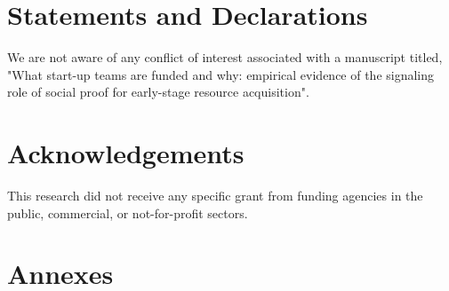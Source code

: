 \documentclass[12pt]{article}
\begin{document}



\clearpage





\clearpage
\section{Statements and Declarations}
We are not aware of any conflict of interest associated with a manuscript titled, "What start-up teams are funded and why: empirical evidence of the signaling role of social proof for early-stage resource acquisition".

\section{Acknowledgements}
This research did not receive any specific grant from funding agencies in the public, commercial, or not-for-profit sectors.

\section{Annexes}
\end{document}
